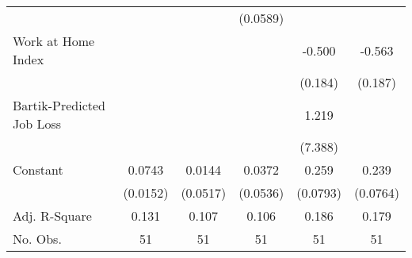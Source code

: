 {\begin{tabular}{l*{5}{c}}
            &                     &                     &    (0.0589)         &                     &                     \\
Work at Home Index&                     &                     &                     &      -0.500\sym{***}&      -0.563\sym{***}\\
            &                     &                     &                     &     (0.184)         &     (0.187)         \\
Bartik-Predicted Job Loss&                     &                     &                     &       1.219         &                     \\
            &                     &                     &                     &     (7.388)         &                     \\
Constant    &      0.0743\sym{***}&      0.0144         &      0.0372         &       0.259\sym{***}&       0.239\sym{***}\\
            &    (0.0152)         &    (0.0517)         &    (0.0536)         &    (0.0793)         &    (0.0764)         \\
\hline
Adj. R-Square&       0.131         &       0.107         &       0.106         &       0.186         &       0.179         \\
No. Obs.    &          51         &          51         &          51         &          51         &          51         \\
\hline\hline
\end{tabular}
}
